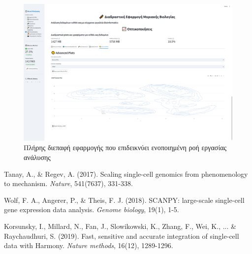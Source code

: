 \documentclass[11pt,a4paper]{article}
\begin{document}
\begin{figure}[H]
    \includegraphics[width=1.0\linewidth]{density_plot.png}
    \caption{Πλήρης διεπαφή εφαρμογής που επιδεικνύει ενοποιημένη ροή εργασίας ανάλυσης}
    \label{fig:complete_interface}
\end{figure}

\begin{thebibliography}{9}
Tanay, A., \& Regev, A. (2017). Scaling single-cell genomics from phenomenology to mechanism. \textit{Nature}, 541(7637), 331-338.

Wolf, F. A., Angerer, P., \& Theis, F. J. (2018). SCANPY: large-scale single-cell gene expression data analysis. \textit{Genome biology}, 19(1), 1-5.

Korsunsky, I., Millard, N., Fan, J., Slowikowski, K., Zhang, F., Wei, K., ... \& Raychaudhuri, S. (2019). Fast, sensitive and accurate integration of single-cell data with Harmony. \textit{Nature methods}, 16(12), 1289-1296.

\end{thebibliography}
\end{document}
